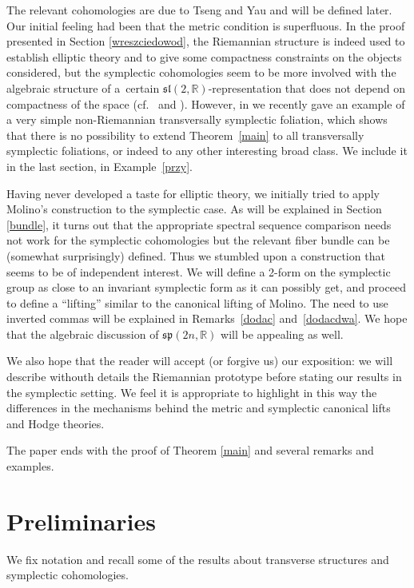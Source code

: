 \documentclass[10pt,a4paper]{amsart}
\numberwithin{equation}{section}
\begin{document}
The relevant cohomologies are due to Tseng and Yau and will be defined later. Our initial feeling had been that the metric condition is superfluous. In the proof presented in Section \ref{wreszciedowod}, the Riemannian structure is indeed used to establish elliptic theory and to give some compactness constraints on the objects considered, but the symplectic cohomologies seem to be more involved with the algebraic structure of a~certain $\mathfrak{sl}(2,\mathbb{R})$-representation that does not depend on compactness of the space (cf.~\cite{yan} and \cite[Section~3.2.1]{tseng}). However, in \cite{pawelija} we recently gave an example of a very simple non-Riemannian transversally symplectic foliation, which shows that there is no possibility to extend Theorem~\ref{main} to all transversally symplectic foliations, or indeed to any other interesting broad class. We include it in the last section, in Example~\ref{przy}.

 Having never developed a taste for elliptic theory, we initially tried to apply Molino's construction to the symplectic case. As will be explained in Section \ref{bundle}, it turns out that the appropriate spectral sequence comparison needs not work for the symplectic cohomologies but the relevant fiber bundle can be (somewhat surprisingly) defined. Thus we stumbled upon a construction that seems to be of independent interest. We will define a 2-form on the symplectic group as close to an invariant symplectic form as it can possibly get, and proceed to define a ``lifting'' similar to the canonical lifting of Molino. The need to use inverted commas will be explained in Remarks~\ref{dodac} and~\ref{dodacdwa}. We hope that the algebraic discussion of $\mathfrak{sp}(2n,\mathbb{R})$ will be appealing as well.

We also hope that the reader will accept (or forgive us) our exposition: we will describe withouth details the Riemannian prototype before stating our results in the symplectic setting. We feel it is appropriate to highlight in this way the differences in the mechanisms behind the metric and symplectic canonical lifts and Hodge theories.

The paper ends with the proof of Theorem \ref{main} and several remarks and examples.

\section{Preliminaries} \label{preliminaries}

We fix notation and recall some of the results about transverse structures and symplectic cohomologies.
\end{document}
